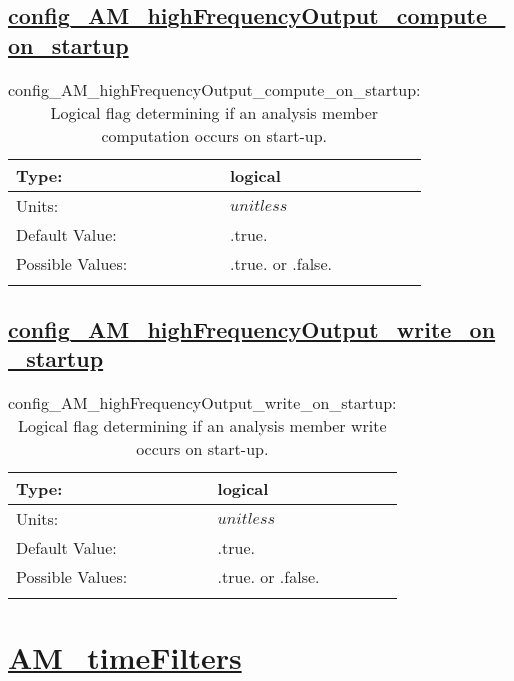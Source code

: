 \subsection[config\_AM\_highFrequencyOutput\_compute\_on\_startup]{\hyperref[sec:nm_tab_AM_highFrequencyOutput]{config\_AM\_highFrequencyOutput\_compute\_on\_startup}}
\label{subsec:nm_sec_config_AM_highFrequencyOutput_compute_on_startup}
\begin{center}
\begin{longtable}{| p{2.0in} || p{4.0in} |}
    \hline
    Type: & logical \\
    \hline
    Units: & $unitless$ \\
    \hline
    Default Value: & .true. \\
    \hline
    Possible Values: & .true. or .false. \\
    \hline
    \caption{config\_AM\_highFrequencyOutput\_compute\_on\_startup: Logical flag determining if an analysis member computation occurs on start-up.}
\end{longtable}
\end{center}
\subsection[config\_AM\_highFrequencyOutput\_write\_on\_startup]{\hyperref[sec:nm_tab_AM_highFrequencyOutput]{config\_AM\_highFrequencyOutput\_write\_on\_startup}}
\label{subsec:nm_sec_config_AM_highFrequencyOutput_write_on_startup}
\begin{center}
\begin{longtable}{| p{2.0in} || p{4.0in} |}
    \hline
    Type: & logical \\
    \hline
    Units: & $unitless$ \\
    \hline
    Default Value: & .true. \\
    \hline
    Possible Values: & .true. or .false. \\
    \hline
    \caption{config\_AM\_highFrequencyOutput\_write\_on\_startup: Logical flag determining if an analysis member write occurs on start-up.}
\end{longtable}
\end{center}
\section[AM\_timeFilters]{\hyperref[sec:nm_tab_AM_timeFilters]{AM\_timeFilters}}
\label{sec:nm_sec_AM_timeFilters}
